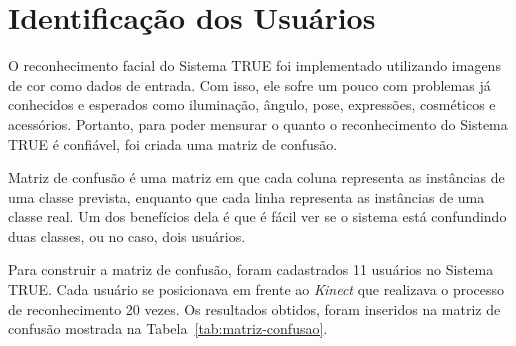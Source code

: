 \section{Identificação dos Usuários}
	 
	O reconhecimento facial do Sistema TRUE foi implementado utilizando imagens de cor como dados de entrada. Com isso, ele sofre um pouco com problemas já conhecidos e esperados como iluminação, ângulo, pose, expressões, cosméticos e acessórios. Portanto, para poder mensurar o quanto o reconhecimento do Sistema TRUE é confiável, foi criada uma matriz de confusão.

	Matriz de confusão é uma matriz em que cada coluna representa as instâncias de uma classe prevista, enquanto que cada linha representa as instâncias de uma classe real. Um dos benefícios dela é que é fácil ver se o sistema está confundindo duas classes, ou no caso, dois usuários.

	Para construir a matriz de confusão, foram cadastrados 11 usuários no Sistema
	TRUE. Cada usuário se posicionava em frente ao \textit{Kinect} que realizava
	o processo de reconhecimento 20 vezes. Os resultados obtidos, foram inseridos
	na matriz de confusão mostrada na Tabela~\ref{tab:matriz-confusao}.
	
